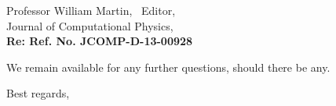\begin{letter}{Professor William Martin, \  Editor,\\
    Journal of Computational Physics,\\
\textbf{Re: Ref. No. JCOMP-D-13-00928}}
\bigskip

We remain available for any further questions, should there be any.
\vspace{0.25cm}



\closing{Best regards, }

\end{letter}



